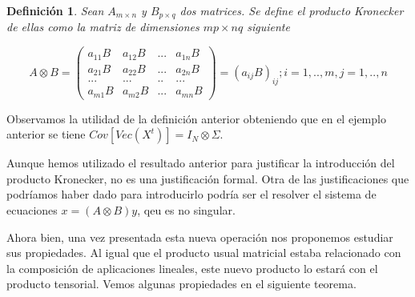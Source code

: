 \documentclass{article}
\theoremstyle{theorem-style}  %
\theoremstyle{definition-style}
\newtheorem{definition}{Definición}[section]
\theoremstyle{example-style}
\theoremstyle{exercise-style}
\begin{document}
	\begin{definition}
		Sean $A_{m \times n}$ y $B_{p \times q}$ dos matrices. Se define el producto Kronecker de ellas como la matriz de dimensiones $mp \times nq$ siguiente
		
		$$A \otimes B =  \left( {\begin{array}{cccc}
			a_{11}B & a_{12}B & ... & a_{1n}B\\
			a_{21}B & a_{22}B & ... & a_{2n}B\\
			... & ... & .. & ... \\
			a_{m1}B & a_{m2}B  & ... & a_{mn}B
			\end{array}}\right) = (a_{ij}B)_{ij} ; i = 1,.., m, j = 1,.., n$$
		
	\end{definition}
	
	Observamos la utilidad de la definición anterior obteniendo que en el ejemplo anterior se tiene $Cov[Vec(X^t)] = I_N \otimes \Sigma$.
	
	Aunque hemos utilizado el resultado anterior para justificar la introducción del producto Kronecker, no es una justificación formal. Otra de las justificaciones que podríamos haber dado para introducirlo podría ser  el resolver el sistema de ecuaciones $x = (A \otimes B)y$, qeu es no singular. 
	
	Ahora bien, una vez presentada esta nueva operación nos proponemos estudiar sus propiedades. Al igual que el producto usual matricial estaba relacionado con la composición de aplicaciones lineales, este nuevo producto lo estará con el producto tensorial. Vemos algunas propiedades en el siguiente teorema.
	
\end{document}
